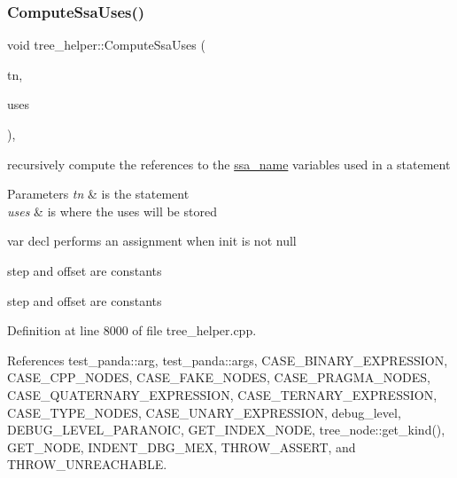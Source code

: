\subsubsection{\texorpdfstring{Compute\+Ssa\+Uses()}{ComputeSsaUses()}\hspace{0.1cm}{\footnotesize\ttfamily [1/2]}}
{\footnotesize\ttfamily void tree\+\_\+helper\+::\+Compute\+Ssa\+Uses (\begin{DoxyParamCaption}\item[{const \hyperlink{tree__node_8hpp_a6ee377554d1c4871ad66a337eaa67fd5}{tree\+\_\+node\+Ref}}]{tn,  }\item[{\hyperlink{classTreeNodeMap}{Tree\+Node\+Map}$<$ \hyperlink{tutorial__fpt__2017_2intro_2sixth_2test_8c_a7c94ea6f8948649f8d181ae55911eeaf}{size\+\_\+t} $>$ \&}]{uses }\end{DoxyParamCaption})\hspace{0.3cm}{\ttfamily [static]}, {\ttfamily [private]}}



recursively compute the references to the \hyperlink{structssa__name}{ssa\+\_\+name} variables used in a statement 


\begin{DoxyParams}{Parameters}
{\em tn} & is the statement \\
\hline
{\em uses} & is where the uses will be stored \\
\hline
\end{DoxyParams}
var decl performs an assignment when init is not null

step and offset are constants

step and offset are constants 

Definition at line 8000 of file tree\+\_\+helper.\+cpp.



References test\+\_\+panda\+::arg, test\+\_\+panda\+::args, C\+A\+S\+E\+\_\+\+B\+I\+N\+A\+R\+Y\+\_\+\+E\+X\+P\+R\+E\+S\+S\+I\+ON, C\+A\+S\+E\+\_\+\+C\+P\+P\+\_\+\+N\+O\+D\+ES, C\+A\+S\+E\+\_\+\+F\+A\+K\+E\+\_\+\+N\+O\+D\+ES, C\+A\+S\+E\+\_\+\+P\+R\+A\+G\+M\+A\+\_\+\+N\+O\+D\+ES, C\+A\+S\+E\+\_\+\+Q\+U\+A\+T\+E\+R\+N\+A\+R\+Y\+\_\+\+E\+X\+P\+R\+E\+S\+S\+I\+ON, C\+A\+S\+E\+\_\+\+T\+E\+R\+N\+A\+R\+Y\+\_\+\+E\+X\+P\+R\+E\+S\+S\+I\+ON, C\+A\+S\+E\+\_\+\+T\+Y\+P\+E\+\_\+\+N\+O\+D\+ES, C\+A\+S\+E\+\_\+\+U\+N\+A\+R\+Y\+\_\+\+E\+X\+P\+R\+E\+S\+S\+I\+ON, debug\+\_\+level, D\+E\+B\+U\+G\+\_\+\+L\+E\+V\+E\+L\+\_\+\+P\+A\+R\+A\+N\+O\+IC, G\+E\+T\+\_\+\+I\+N\+D\+E\+X\+\_\+\+N\+O\+DE, tree\+\_\+node\+::get\+\_\+kind(), G\+E\+T\+\_\+\+N\+O\+DE, I\+N\+D\+E\+N\+T\+\_\+\+D\+B\+G\+\_\+\+M\+EX, T\+H\+R\+O\+W\+\_\+\+A\+S\+S\+E\+RT, and T\+H\+R\+O\+W\+\_\+\+U\+N\+R\+E\+A\+C\+H\+A\+B\+LE.



